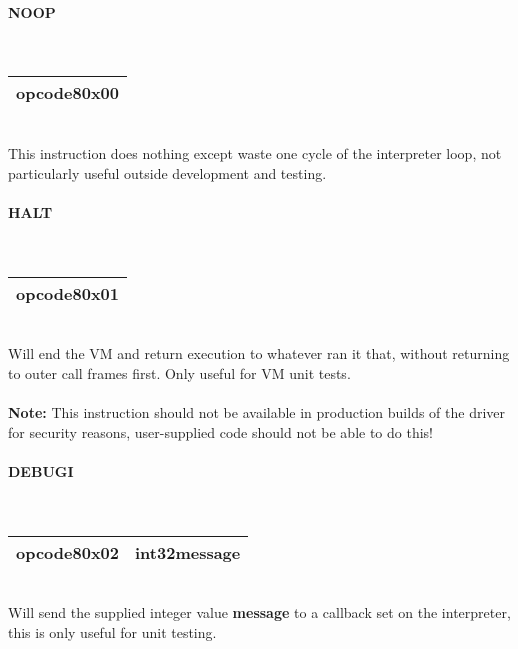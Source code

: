 \documentclass[12pt,a4paper]{article}
\begin{document}

\bigskip
\begin{minipage}{\textwidth}
\paragraph{NOOP}
~\vspace{1em}\\\begin{tabular}{|p{2cm}|}
\hline
opcode8\newline\textbf{0x00} \\
\hline
\end{tabular}\vspace{1em}\\
This instruction does nothing except waste one cycle of the interpreter loop, not particularly useful outside development and testing.
\end{minipage}

\vspace{2em}\begin{minipage}{\textwidth}
\paragraph{HALT}
~\vspace{1em}\\\begin{tabular}{|p{2cm}|}
\hline
opcode8\newline\textbf{0x01} \\
\hline
\end{tabular}\vspace{1em}\\
Will end the VM and return execution to whatever ran it that, without returning to outer call frames first. Only useful for VM unit tests.
\\\\\textbf{Note:} This instruction should not be available in production builds of the driver for security reasons, user-supplied code should not be able to do this!
\end{minipage}

\vspace{2em}\begin{minipage}{\textwidth}
\paragraph{DEBUGI}
~\vspace{1em}\\\begin{tabular}{|p{2cm}|p{8cm}|}
\hline
opcode8\newline\textbf{0x02} & int32\newline\textbf{message} \\
\hline
\end{tabular}\vspace{1em}\\
Will send the supplied integer value \textbf{message} to a callback set on the interpreter, this is only useful for unit testing.
\end{minipage}
\end{document}
